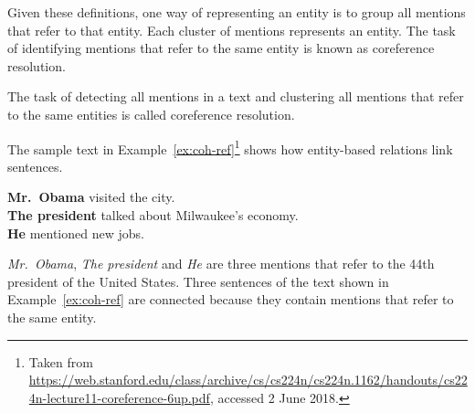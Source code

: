 Given these definitions, one way of representing an entity is to group all mentions that refer to that entity. 
Each cluster of mentions represents an entity. 
The task of identifying mentions that refer to the same entity is known as coreference resolution.  

\begin{definition}
	The task of detecting all mentions in a text and clustering all mentions that refer to the same entities is called coreference resolution. 
\end{definition}

 
The sample text in Example~\ref{ex:coh-ref}\footnote{Taken from \url{https://web.stanford.edu/class/archive/cs/cs224n/cs224n.1162/handouts/cs224n-lecture11-coreference-6up.pdf}, accessed 2 June 2018.} shows how entity-based relations link sentences. 

\begin{examples}
	\label{ex:coh-ref}
	\textbf{Mr.\ Obama} visited the city. \\
	\textbf{The president} talked about Milwaukee’s economy. \\
	\textbf{He} mentioned new jobs. \\
\end{examples} 

\emph{Mr.\ Obama}, \emph{The president} and \emph{He} are three mentions that refer to the 44th president of the United States. 
Three sentences of the text shown in Example~\ref{ex:coh-ref} are connected because they contain mentions that refer to the same entity. 

